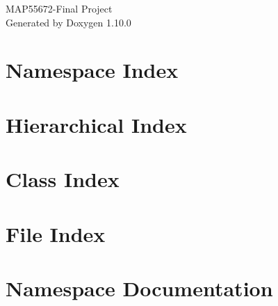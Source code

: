 \documentclass[twoside]{book}
\newcommand{\+}{\discretionary{\mbox{\scriptsize$\hookleftarrow$}}{}{}}
\newcommand{\clearemptydoublepage}{%
    \newpage{\pagestyle{empty}\cleardoublepage}%
  }
\begin{document}
  \raggedbottom
    \hypersetup{pageanchor=false,
                bookmarksnumbered=true,
                pdfencoding=unicode
               }
  \begin{titlepage}
  \vspace*{7cm}
  \begin{center}%
  {\Large MAP55672-\/\+Final Project}\\
  \vspace*{1cm}
  {\large Generated by Doxygen 1.10.0}\\
  \end{center}
  \end{titlepage}
  \clearemptydoublepage
  \tableofcontents
  \clearemptydoublepage
  \hypersetup{pageanchor=true}

\chapter{Namespace Index}

\chapter{Hierarchical Index}

\chapter{Class Index}

\chapter{File Index}

\chapter{Namespace Documentation}











\end{document}
